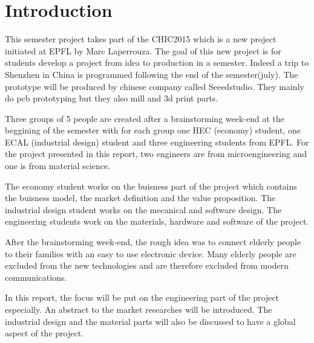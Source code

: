 \section{Introduction}

This semester project takes part of the CHIC2015 which is a new project initiated at EPFL by Marc Laperrouza. The goal of this new project is for students develop a project from idea to production in a semester. Indeed a trip to Shenzhen in China is programmed following the end of the semester(july). The prototype will be produced by chinese company called Seeedstudio. They mainly do pcb prototyping but they also mill and 3d print parts.

Three groups of 5 people are created after a brainstorming week-end at the beggining of the semester with for each group one HEC (economy) student, one ECAL (industrial design) student and three engineering students from EPFL. For the project presented in this report, two engineers are from microengineering and one is from material science.

The economy student works on the buisness part of the project which contains the buisness model, the market definition and the value proposition. The industrial design student works on the mecanical and software design. The engineering students work on the materials, hardware and software of the project.

After the brainstorming week-end, the rough idea was to connect elderly people to their families with an easy to use electronic device. Many elderly people are excluded from the new technologies and are therefore excluded from modern communications.

In this report, the focus will be put on the engineering part of the project especially. An abstract to the market researches will be introduced. The industrial design and the material parts will also be discussed to have a global aspect of the project.
